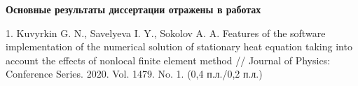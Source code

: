 \textbf{Основные результаты диссертации отражены в работах}

1. Kuvyrkin G. N., Savelyeva I. Y., Sokolov A. A. Features of the software implementation of the numerical solution of stationary heat equation taking into account the effects of nonlocal finite element method // Journal of Physics: Conference Series. 2020. Vol. 1479. No. 1. (0,4 п.л./0,2 п.л.)

